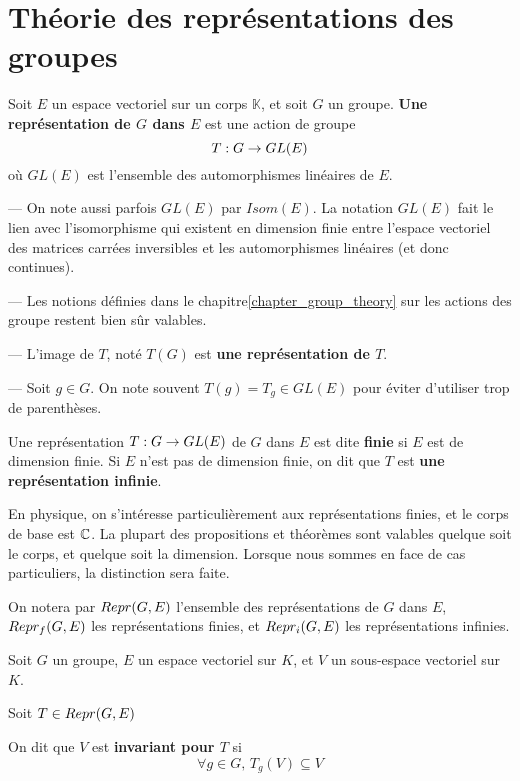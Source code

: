 \chapter{Théorie des représentations des groupes}


\begin{definition}
	Soit $E$ un espace vectoriel sur un corps $\mathbb{K}$, et soit $G$ un groupe.
	\textbf{Une représentation de $G$ dans $E$} est une action de groupe
	\begin{equation}
		T : G \rightarrow GL(E)
		\label{definition_representation}
	\end{equation}
	où $GL(E)$ est l'ensemble des automorphismes linéaires de $E$.
\end{definition}

\begin{remarque}
	--- On note aussi parfois $GL(E)$ par $Isom(E)$. La notation $GL(E)$ fait le
	lien avec l'isomorphisme qui existent en dimension finie entre l'espace
	vectoriel des matrices carrées inversibles et les automorphismes linéaires
	(et donc continues).

	--- Les notions définies dans le chapitre\ref{chapter_group_theory} sur les
	actions des groupe restent bien sûr valables.

	--- L'image de $T$, noté $T(G)$ est \textbf{une représentation de $T$}.

	--- Soit $g \in G$. On note souvent $T(g) = T_{g} \in GL(E)$ pour éviter
	d'utiliser trop de parenthèses.

\end{remarque}

\begin{definition}
	Une représentation $T : G \rightarrow GL(E)$ de $G$ dans $E$ est dite
	\textbf{finie} si $E$ est de dimension finie. Si $E$ n'est pas de dimension
	finie, on dit que $T$ est \textbf{une représentation infinie}.
\end{definition}

En physique, on s'intéresse particulièrement aux représentations finies, et le
corps de base est $\mathbb{C}$. La plupart des propositions et théorèmes sont
valables quelque soit le corps, et quelque soit la dimension.
Lorsque nous sommes en face de cas particuliers, la distinction sera faite.

On notera par $Repr(G, E)$ l'ensemble des représentations de $G$ dans $E$,
$Repr_{f}(G, E)$ les représentations finies, et $Repr_{i}(G, E)$ les
représentations infinies.

\begin{definition}
	Soit $G$ un groupe, $E$ un espace vectoriel sur $K$, et $V$ un sous-espace
	vectoriel sur $K$.

	Soit $T \in Repr(G, E)$

	On dit que $V$ est \textbf{invariant pour $T$} si
	\begin{equation}
		\forall g \in G, \, T_{g}(V) \subseteq V
		\label{definition_invariant_subspace}
	\end{equation}
\end{definition}

